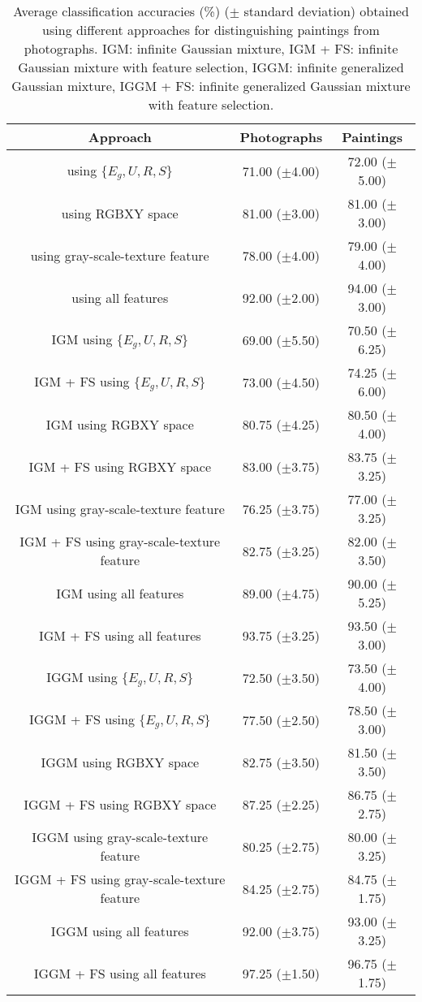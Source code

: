 \documentclass[journal,10pt]{elsart}
\begin{document}
\begin{table}[!ht]
 \begin{center}
 \caption{Average classification accuracies (\%) ($\pm$ standard deviation) obtained using different approaches for distinguishing paintings from photographs. IGM: infinite Gaussian mixture, IGM + FS: infinite Gaussian mixture with feature selection, IGGM: infinite generalized Gaussian mixture, IGGM + FS: infinite generalized Gaussian mixture with feature selection.}\label{tab1}
 \small
 \begin{tabular}{|c|c|c|}
 \hline
Approach &Photographs&Paintings\\
 \hline
  \cite{Cutzu2003,Cutzu2005} using $\{E_g,U,R,S\}$&71.00 ($\pm$4.00)&72.00 ($\pm$5.00)\\
  \hline
  \cite{Cutzu2003,Cutzu2005} using RGBXY space &81.00 ($\pm$3.00)&81.00 ($\pm$3.00)\\
  \hline
 \cite{Cutzu2003,Cutzu2005} using gray-scale-texture feature&78.00 ($\pm$4.00)&79.00 ($\pm$4.00)\\
  \hline
  \cite{Cutzu2003,Cutzu2005} using all features&92.00 ($\pm$2.00)&94.00 ($\pm$3.00)\\
 \hline
 IGM using $\{E_g,U,R,S\}$&69.00 ($\pm$5.50)&70.50 ($\pm$6.25)\\
 \hline
   IGM + FS using $\{E_g,U,R,S\}$&73.00 ($\pm$4.50)&74.25 ($\pm$6.00)\\
  \hline
 IGM using RGBXY space&80.75 ($\pm$4.25)&80.50 ($\pm$4.00)\\
  \hline
  IGM + FS using RGBXY space&83.00 ($\pm$3.75)&83.75 ($\pm$3.25)\\
  \hline
 IGM using gray-scale-texture feature&76.25 ($\pm$3.75)&77.00 ($\pm$3.25)\\
  \hline
  IGM + FS using gray-scale-texture feature&82.75 ($\pm$3.25)&82.00 ($\pm$3.50)\\
  \hline
   IGM   using all features&89.00 ($\pm$4.75)&90.00 ($\pm$5.25)\\
  \hline
  IGM + FS  using all features&93.75 ($\pm$3.25)&93.50 ($\pm$3.00)\\
  \hline
   IGGM using $\{E_g,U,R,S\}$&72.50 ($\pm$3.50)&73.50 ($\pm$4.00)\\
 \hline
   IGGM + FS using $\{E_g,U,R,S\}$&77.50 ($\pm$2.50)&78.50 ($\pm$3.00)\\
  \hline
 IGGM using RGBXY space&82.75 ($\pm$3.50)&81.50 ($\pm$3.50)\\
  \hline
  IGGM + FS using RGBXY space&87.25 ($\pm$2.25)&86.75 ($\pm$2.75)\\
  \hline
 IGGM using gray-scale-texture feature&80.25 ($\pm$2.75)&80.00 ($\pm$3.25)\\
  \hline
  IGGM + FS using gray-scale-texture feature&84.25 ($\pm$2.75)&84.75 ($\pm$1.75)\\
  \hline
   IGGM   using all features&92.00 ($\pm$3.75)&93.00 ($\pm$3.25)\\
  \hline
  IGGM + FS  using all features&97.25 ($\pm$1.50)&96.75 ($\pm$1.75)\\
  \hline
 \end{tabular}
 \end{center}
 \end{table}
\end{document}
